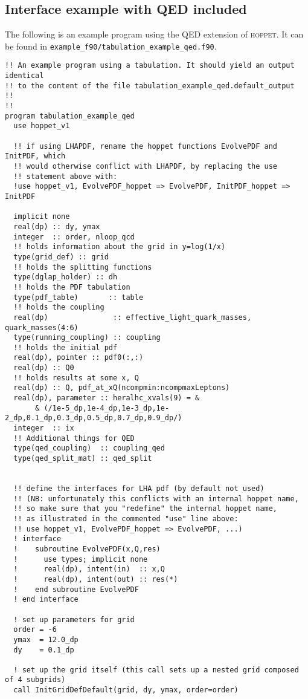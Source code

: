 \documentclass[12pt]{article}
\newcommand{\hoppet}{\textsc{hoppet}\xspace}
\newcommand{\ttt}[1]{\texttt{#1}}
\begin{document}
\subsection{Interface example with QED included}
  The following is an example program using the QED extension of \hoppet{}.
  It can be found in \ttt{example\_f90/tabulation\_example\_qed.f90}.
  
\begin{lstlisting}
!! An example program using a tabulation. It should yield an output identical
!! to the content of the file tabulation_example_qed.default_output
!!
!!
program tabulation_example_qed
  use hoppet_v1
  
  !! if using LHAPDF, rename the hoppet functions EvolvePDF and InitPDF, which
  !! would otherwise conflict with LHAPDF, by replacing the use
  !! statement above with:
  !use hoppet_v1, EvolvePDF_hoppet => EvolvePDF, InitPDF_hoppet => InitPDF

  implicit none
  real(dp) :: dy, ymax
  integer  :: order, nloop_qcd
  !! holds information about the grid in y=log(1/x)
  type(grid_def) :: grid
  !! holds the splitting functions
  type(dglap_holder) :: dh
  !! holds the PDF tabulation
  type(pdf_table)       :: table
  !! holds the coupling
  real(dp)               :: effective_light_quark_masses, quark_masses(4:6)
  type(running_coupling) :: coupling
  !! holds the initial pdf
  real(dp), pointer :: pdf0(:,:)
  real(dp) :: Q0
  !! holds results at some x, Q
  real(dp) :: Q, pdf_at_xQ(ncompmin:ncompmaxLeptons)
  real(dp), parameter :: heralhc_xvals(9) = &
       & (/1e-5_dp,1e-4_dp,1e-3_dp,1e-2_dp,0.1_dp,0.3_dp,0.5_dp,0.7_dp,0.9_dp/)
  integer  :: ix
  !! Additional things for QED
  type(qed_coupling)  :: coupling_qed
  type(qed_split_mat) :: qed_split


  !! define the interfaces for LHA pdf (by default not used)
  !! (NB: unfortunately this conflicts with an internal hoppet name,
  !! so make sure that you "redefine" the internal hoppet name, 
  !! as illustrated in the commented "use" line above:
  !! use hoppet_v1, EvolvePDF_hoppet => EvolvePDF, ...)
  ! interface
  !    subroutine EvolvePDF(x,Q,res)
  !      use types; implicit none
  !      real(dp), intent(in)  :: x,Q
  !      real(dp), intent(out) :: res(*)
  !    end subroutine EvolvePDF
  ! end interface

  ! set up parameters for grid
  order = -6
  ymax  = 12.0_dp
  dy    = 0.1_dp

  ! set up the grid itself (this call sets up a nested grid composed of 4 subgrids)
  call InitGridDefDefault(grid, dy, ymax, order=order)


\end{lstlisting}
\end{document}
